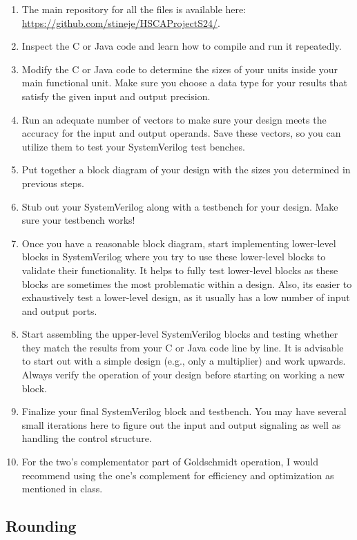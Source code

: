 \documentclass[times, 10pt, twocolumn]{IEEEtran}
\begin{document}
\begin{enumerate}
\item The main repository for all the files is available here:
  \url{https://github.com/stineje/HSCAProjectS24/}.    
\item Inspect the C or Java code and learn how to compile and run it
  repeatedly.
\item Modify the C or Java code to determine the sizes of your units
  inside your main functional unit.  Make sure you choose a data type
  for your results that satisfy the given input and output precision.
\item Run an adequate number of vectors to make sure your design meets the
  accuracy for the input and output operands.  Save these vectors, so
  you can utilize them to test your SystemVerilog test
  benches.  
\item Put together a block diagram of your design with the sizes you
  determined in previous steps.
\item Stub out your SystemVerilog along with a testbench for your
  design.  Make sure your testbench works!
\item Once you have a reasonable block diagram, start implementing
  lower-level blocks in SystemVerilog where you try to use
  these lower-level blocks to validate their functionality.  It helps
  to fully test lower-level blocks as these blocks are
  sometimes the most problematic within a design.  Also, its easier to
  exhaustively test a lower-level design, as it usually has a low
  number of input and output ports.
\item Start assembling the upper-level SystemVerilog 
  blocks and testing whether they match the results from your C or
  Java code line by line.  
  It is advisable to start out with a simple design (e.g.,
  only a multiplier) and work upwards.  Always verify the operation of
  your design before starting on working a new block.
\item Finalize your final SystemVerilog block and testbench.  You may
  have several small iterations here to figure out the input and
  output signaling as well as handling the control structure.
\item For the two's complementator part of Goldschmidt operation, I would
  recommend using the one's complement for efficiency and optimization
  as mentioned in class.
\end{enumerate}

\subsection{Rounding}
\end{document}
